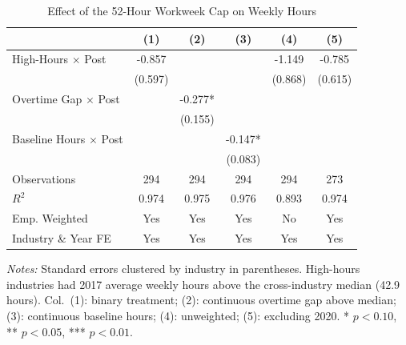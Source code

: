 \begin{table}[t]
\centering
\caption{Effect of the 52-Hour Workweek Cap on Weekly Hours}
\label{tab:main}
\begin{tabular}{lccccc}
\hline\hline
 & (1) & (2) & (3) & (4) & (5) \\
\hline
High-Hours $\times$ Post & -0.857 & & & -1.149 & -0.785 \\
 & (0.597) & & & (0.868) & (0.615) \\
Overtime Gap $\times$ Post & & -0.277* & & & \\
 & & (0.155) & & & \\
Baseline Hours $\times$ Post & & & -0.147* & & \\
 & & & (0.083) & & \\
\hline
Observations & 294 & 294 & 294 & 294 & 273 \\
$R^2$ & 0.974 & 0.975 & 0.976 & 0.893 & 0.974 \\
Emp. Weighted & Yes & Yes & Yes & No & Yes \\
Industry \& Year FE & Yes & Yes & Yes & Yes & Yes \\
\hline\hline
\end{tabular}
\begin{tablenotes}
\small
\item \textit{Notes:} Standard errors clustered by industry in parentheses. High-hours industries had 2017 average weekly hours above the cross-industry median (42.9 hours). Col.~(1): binary treatment; (2): continuous overtime gap above median; (3): continuous baseline hours; (4): unweighted; (5): excluding 2020. * $p<0.10$, ** $p<0.05$, *** $p<0.01$.
\end{tablenotes}
\end{table}
